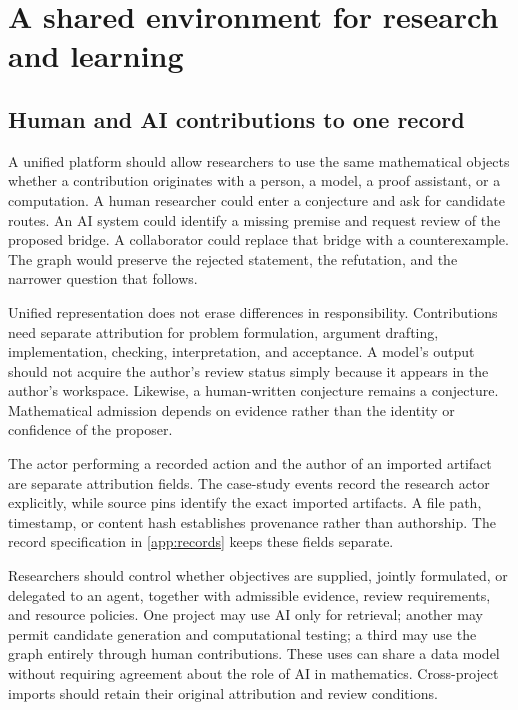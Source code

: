 \section{A shared environment for research and learning}\label{sec:people}

\subsection{Human and AI contributions to one record}

A unified platform should allow researchers to use the same mathematical objects whether a contribution originates with a person, a model, a proof assistant, or a computation. A human researcher could enter a conjecture and ask for candidate routes. An AI system could identify a missing premise and request review of the proposed bridge. A collaborator could replace that bridge with a counterexample. The graph would preserve the rejected statement, the refutation, and the narrower question that follows.

Unified representation does not erase differences in responsibility. Contributions need separate attribution for problem formulation, argument drafting, implementation, checking, interpretation, and acceptance. A model's output should not acquire the author's review status simply because it appears in the author's workspace. Likewise, a human-written conjecture remains a conjecture. Mathematical admission depends on evidence rather than the identity or confidence of the proposer.

The actor performing a recorded action and the author of an imported artifact are separate attribution fields. The case-study events record the research actor explicitly, while source pins identify the exact imported artifacts. A file path, timestamp, or content hash establishes provenance rather than authorship. The record specification in \cref{app:records} keeps these fields separate.

Researchers should control whether objectives are supplied, jointly formulated, or delegated to an agent, together with admissible evidence, review requirements, and resource policies. One project may use AI only for retrieval; another may permit candidate generation and computational testing; a third may use the graph entirely through human contributions. These uses can share a data model without requiring agreement about the role of AI in mathematics. Cross-project imports should retain their original attribution and review conditions.

